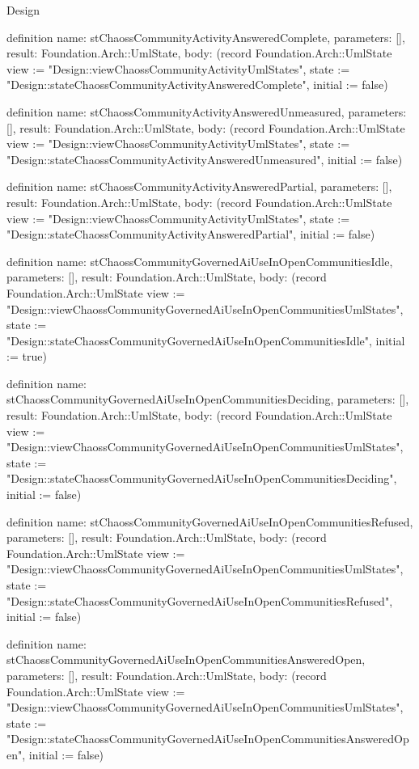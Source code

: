 \begin{lexlean}{Design}
\begin{semanticmodule}
definition{
  name: stChaossCommunityActivityAnsweredComplete,
  parameters: [],
  result: Foundation.Arch::UmlState,
  body: (record Foundation.Arch::UmlState {view := "Design::viewChaossCommunityActivityUmlStates", state := "Design::stateChaossCommunityActivityAnsweredComplete", initial := false})
}

definition{
  name: stChaossCommunityActivityAnsweredUnmeasured,
  parameters: [],
  result: Foundation.Arch::UmlState,
  body: (record Foundation.Arch::UmlState {view := "Design::viewChaossCommunityActivityUmlStates", state := "Design::stateChaossCommunityActivityAnsweredUnmeasured", initial := false})
}

definition{
  name: stChaossCommunityActivityAnsweredPartial,
  parameters: [],
  result: Foundation.Arch::UmlState,
  body: (record Foundation.Arch::UmlState {view := "Design::viewChaossCommunityActivityUmlStates", state := "Design::stateChaossCommunityActivityAnsweredPartial", initial := false})
}

definition{
  name: stChaossCommunityGovernedAiUseInOpenCommunitiesIdle,
  parameters: [],
  result: Foundation.Arch::UmlState,
  body: (record Foundation.Arch::UmlState {view := "Design::viewChaossCommunityGovernedAiUseInOpenCommunitiesUmlStates", state := "Design::stateChaossCommunityGovernedAiUseInOpenCommunitiesIdle", initial := true})
}

definition{
  name: stChaossCommunityGovernedAiUseInOpenCommunitiesDeciding,
  parameters: [],
  result: Foundation.Arch::UmlState,
  body: (record Foundation.Arch::UmlState {view := "Design::viewChaossCommunityGovernedAiUseInOpenCommunitiesUmlStates", state := "Design::stateChaossCommunityGovernedAiUseInOpenCommunitiesDeciding", initial := false})
}

definition{
  name: stChaossCommunityGovernedAiUseInOpenCommunitiesRefused,
  parameters: [],
  result: Foundation.Arch::UmlState,
  body: (record Foundation.Arch::UmlState {view := "Design::viewChaossCommunityGovernedAiUseInOpenCommunitiesUmlStates", state := "Design::stateChaossCommunityGovernedAiUseInOpenCommunitiesRefused", initial := false})
}

definition{
  name: stChaossCommunityGovernedAiUseInOpenCommunitiesAnsweredOpen,
  parameters: [],
  result: Foundation.Arch::UmlState,
  body: (record Foundation.Arch::UmlState {view := "Design::viewChaossCommunityGovernedAiUseInOpenCommunitiesUmlStates", state := "Design::stateChaossCommunityGovernedAiUseInOpenCommunitiesAnsweredOpen", initial := false})
}


\end{semanticmodule}
\end{lexlean}
